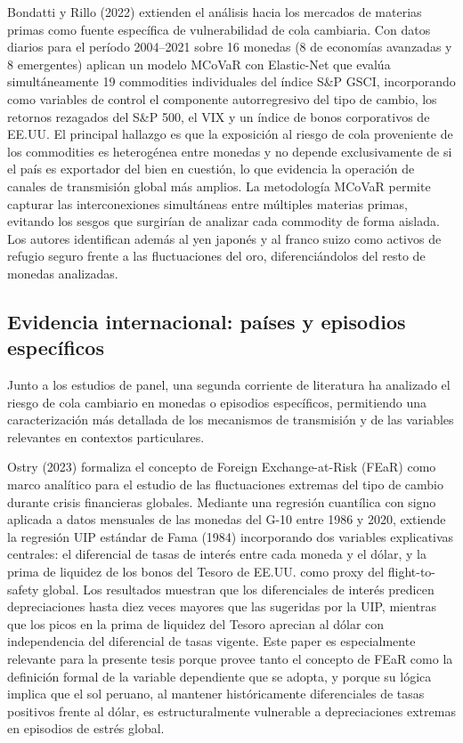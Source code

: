 ﻿\documentclass[11pt,a4paper]{article}
\begin{document}
Bondatti y Rillo (2022) extienden el análisis hacia los mercados de materias primas como fuente específica de vulnerabilidad de cola cambiaria. Con datos diarios para el período 2004–2021 sobre 16 monedas (8 de economías avanzadas y 8 emergentes) aplican un modelo MCoVaR con Elastic-Net que evalúa simultáneamente 19 commodities individuales del índice S\&P GSCI, incorporando como variables de control el componente autorregresivo del tipo de cambio, los retornos rezagados del S\&P 500, el VIX y un índice de bonos corporativos de EE.UU. El principal hallazgo es que la exposición al riesgo de cola proveniente de los commodities es heterogénea entre monedas y no depende exclusivamente de si el país es exportador del bien en cuestión, lo que evidencia la operación de canales de transmisión global más amplios. La metodología MCoVaR permite capturar las interconexiones simultáneas entre múltiples materias primas, evitando los sesgos que surgirían de analizar cada commodity de forma aislada. Los autores identifican además al yen japonés y al franco suizo como activos de refugio seguro frente a las fluctuaciones del oro, diferenciándolos del resto de monedas analizadas.

\subsection{Evidencia internacional: países y episodios específicos}

Junto a los estudios de panel, una segunda corriente de literatura ha analizado el riesgo de cola cambiario en monedas o episodios específicos, permitiendo una caracterización más detallada de los mecanismos de transmisión y de las variables relevantes en contextos particulares.


Ostry (2023) formaliza el concepto de Foreign Exchange-at-Risk (FEaR) como marco analítico para el estudio de las fluctuaciones extremas del tipo de cambio durante crisis financieras globales. Mediante una regresión cuantílica con signo aplicada a datos mensuales de las monedas del G-10 entre 1986 y 2020, extiende la regresión UIP estándar de Fama (1984) incorporando dos variables explicativas centrales: el diferencial de tasas de interés entre cada moneda y el dólar, y la prima de liquidez de los bonos del Tesoro de EE.UU. como proxy del flight-to-safety global. Los resultados muestran que los diferenciales de interés predicen depreciaciones hasta diez veces mayores que las sugeridas por la UIP, mientras que los picos en la prima de liquidez del Tesoro aprecian al dólar con independencia del diferencial de tasas vigente. Este paper es especialmente relevante para la presente tesis porque provee tanto el concepto de FEaR como la definición formal de la variable dependiente que se adopta, y porque su lógica implica que el sol peruano, al mantener históricamente diferenciales de tasas positivos frente al dólar, es estructuralmente vulnerable a depreciaciones extremas en episodios de estrés global.
\end{document}
